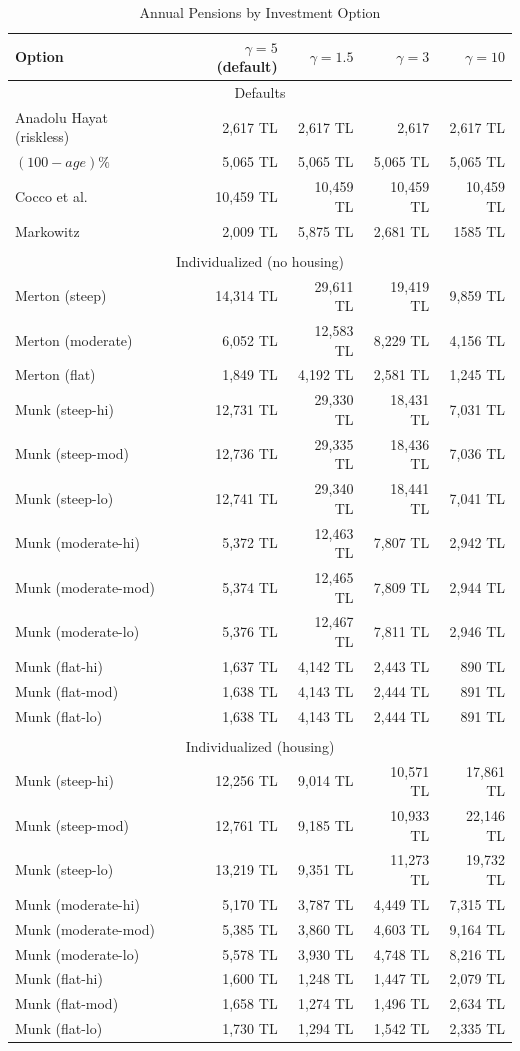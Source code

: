 \begin{table}%
	\centering
	\caption{Annual Pensions by Investment Option}
	\begin{tabular}[c]{lrrrr}
		\hline
		Option&$\gamma=5$ (default) & $\gamma=1.5$ & $\gamma=3$ & $\gamma=10$\\
		\hline
		\multicolumn{5}{c}{Defaults}\\
		Anadolu Hayat (riskless)&2,617 TL&2,617 TL&2,617&2,617 TL\\
		$(100-age)\%$&5,065 TL&5,065 TL&5,065 TL&5,065 TL\\
		Cocco et al.&10,459 TL&10,459 TL&10,459 TL&10,459 TL\\
		Markowitz&2,009 TL&5,875 TL&2,681 TL&1585 TL\\
		\multicolumn{5}{c}{}\\
		\multicolumn{5}{c}{Individualized (no housing)}\\
		Merton (steep) &14,314 TL&29,611 TL&19,419 TL&9,859 TL\\
		Merton (moderate) &6,052 TL&12,583 TL&8,229 TL&4,156 TL\\
		Merton (flat) & 1,849 TL&4,192 TL&2,581 TL&1,245 TL\\
		Munk (steep-hi) &12,731 TL&29,330 TL&18,431 TL&7,031 TL\\
		Munk (steep-mod)&12,736 TL&29,335 TL&18,436 TL&7,036 TL\\
		Munk (steep-lo) &12,741 TL&29,340 TL&18,441 TL&7,041 TL\\
		Munk (moderate-hi)&5,372 TL&12,463 TL&7,807 TL&2,942 TL\\
		Munk (moderate-mod)&5,374 TL&12,465 TL&7,809 TL&2,944 TL\\
		Munk (moderate-lo)&5,376 TL&12,467 TL&7,811 TL&2,946 TL\\
		Munk (flat-hi) &1,637 TL&4,142 TL&2,443 TL&890 TL\\
		Munk (flat-mod) &1,638 TL&4,143 TL&2,444 TL&891 TL\\
		Munk (flat-lo) &1,638 TL&4,143 TL&2,444 TL&891 TL\\
		\multicolumn{5}{c}{}\\
		\multicolumn{5}{c}{Individualized (housing)}\\
		Munk (steep-hi) &12,256 TL&9,014 TL&10,571 TL&17,861 TL\\
		Munk (steep-mod) & 12,761 TL&9,185 TL&10,933 TL&22,146 TL\\
		Munk (steep-lo) &13,219 TL&9,351 TL&11,273 TL&19,732 TL\\
		Munk (moderate-hi)&5,170 TL&3,787 TL&4,449 TL&7,315 TL\\
		Munk (moderate-mod)&5,385 TL&3,860 TL&4,603 TL&9,164 TL\\
		Munk (moderate-lo)&5,578 TL&3,930 TL&4,748 TL&8,216 TL\\
		Munk (flat-hi) & 1,600 TL&1,248 TL&1,447 TL&2,079 TL\\
		Munk (flat-mod) &1,658 TL&1,274 TL&1,496 TL&2,634 TL\\
		Munk (flat-lo) & 1,730 TL&1,294 TL&1,542 TL&2,335 TL\\
		\hline
	\end{tabular}
\end{table}
\resetgeometry


